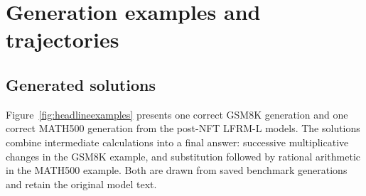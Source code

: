 \documentclass{article}
\begin{document}
\clearpage
\section{Generation examples and trajectories}
\label{app:qualitative}

\subsection{Generated solutions}
\label{app:generations}

Figure~\ref{fig:headlineexamples} presents one correct GSM8K generation and one correct MATH500 generation from the post-NFT LFRM-L models. The solutions combine intermediate calculations into a final answer: successive multiplicative changes in the GSM8K example, and substitution followed by rational arithmetic in the MATH500 example. Both are drawn from saved benchmark generations and retain the original model text.
\end{document}
